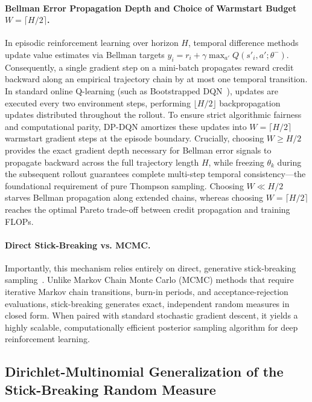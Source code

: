 \documentclass[10pt]{article}
\begin{document}
\paragraph{Bellman Error Propagation Depth and Choice of Warmstart Budget \texorpdfstring{$W = \lceil H / 2 \rceil$}{W = ceil(H/2)}.}
In episodic reinforcement learning over horizon $H$, temporal difference methods update value estimates via Bellman targets $y_i = r_i + \gamma \max_{a'} Q(s'_i, a'; \theta^-)$. Consequently, a single gradient step on a mini-batch propagates reward credit backward along an empirical trajectory chain by at most one temporal transition. In standard online Q-learning (such as Bootstrapped DQN~\citep{osband2018randomized}), updates are executed every two environment steps, performing $\lfloor H / 2 \rfloor$ backpropagation updates distributed throughout the rollout. To ensure strict algorithmic fairness and computational parity, DP-DQN amortizes these updates into $W = \lceil H / 2 \rceil$ warmstart gradient steps at the episode boundary. Crucially, choosing $W \ge H / 2$ provides the exact gradient depth necessary for Bellman error signals to propagate backward across the full trajectory length $H$, while freezing $\theta_k$ during the subsequent rollout guarantees complete multi-step temporal consistency—the foundational requirement of pure Thompson sampling. Choosing $W \ll H / 2$ starves Bellman propagation along extended chains, whereas choosing $W = \lceil H / 2 \rceil$ reaches the optimal Pareto trade-off between credit propagation and training FLOPs.

\paragraph{Direct Stick-Breaking vs. MCMC.}
Importantly, this mechanism relies entirely on direct, generative stick-breaking sampling~\citep{sethuraman1994constructive, ishwaran2001gibbs}. Unlike Markov Chain Monte Carlo (MCMC) methods that require iterative Markov chain transitions, burn-in periods, and acceptance-rejection evaluations, stick-breaking generates exact, independent random measures in closed form. When paired with standard stochastic gradient descent, it yields a highly scalable, computationally efficient posterior sampling algorithm for deep reinforcement learning.

\subsection{Dirichlet-Multinomial Generalization of the Stick-Breaking Random Measure}
\label{sec:dirichlet-generalization-appendix}
\end{document}
